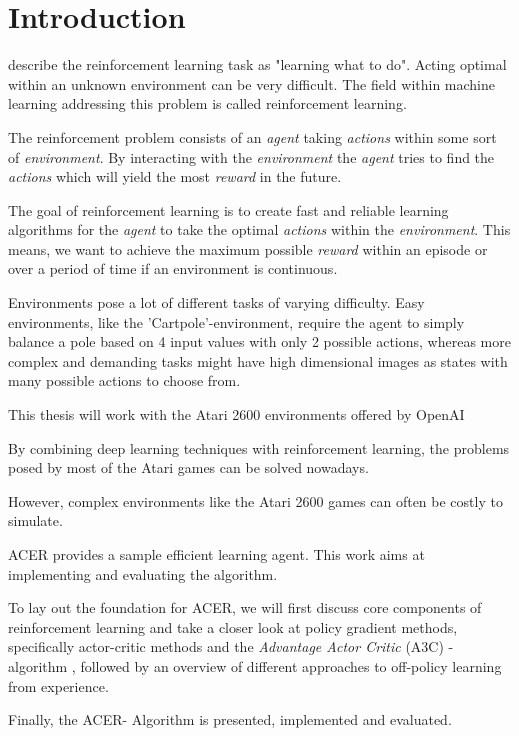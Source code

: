 \section{Introduction}\raggedbottom 
\citet{Sut98} describe the reinforcement learning  task as "learning what to do".
Acting optimal within an unknown environment can be very difficult.
The field within machine learning addressing this problem is called reinforcement learning.

The reinforcement problem consists of an \textit{agent} taking \textit{actions} within some sort of \textit{environment}.
By interacting with the \textit{environment} the \textit{agent} tries to find the \textit{actions} which will yield the most \textit{reward} in the future.

The goal of reinforcement learning is to create fast and reliable learning algorithms for the \textit{agent} to take the optimal \textit{actions} within the \textit{environment}.
This means, we want to achieve the maximum possible \textit{reward} within an episode or over a period of time if an environment is continuous.

Environments pose a lot of different tasks of varying difficulty.
Easy environments, like the 'Cartpole'-environment, require the agent to simply balance a pole based on 4 input values with only 2 possible actions, whereas more complex and demanding tasks might have high dimensional images as states with many possible actions to choose from.

This thesis will work with the Atari 2600 environments offered by OpenAI \citep{openaigym}

By combining deep learning techniques \citep{Hinton504} with reinforcement learning, the problems posed by most of the Atari games can be solved nowadays.

However, complex environments like the Atari 2600 games can often be costly to simulate.

ACER \citep{ACER} provides a sample efficient learning agent. This work aims at implementing and evaluating the algorithm.

To lay out the foundation for ACER, we will first discuss core components of reinforcement learning and take a closer look at policy gradient methods, specifically actor-critic methods and the \textit{Advantage Actor Critic} (A3C) - algorithm \citep{A3C}, followed by an overview of different approaches to off-policy learning from experience.

Finally, the ACER- Algorithm is presented, implemented and evaluated.


\pagebreak